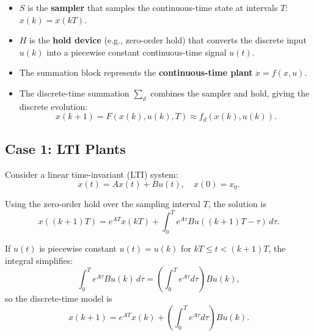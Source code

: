 \begin{center}
\end{center}

\begin{itemize}
    \item \(S\) is the \textbf{sampler} that samples the continuous-time state at intervals \(T\): \(x(k)=x(kT)\).  
    \item \(H\) is the \textbf{hold device} (e.g., zero-order hold) that converts the discrete input \(u(k)\) into a piecewise constant continuous-time signal \(u(t)\).  
    \item The summation block represents the \textbf{continuous-time plant} \(\dot{x}=f(x,u)\).  
    \item The discrete-time summation \(\sum_d\) combines the sampler and hold, giving the discrete evolution:
    \begin{equation}
    x(k+1) = F(x(k), u(k), T) \approx f_d(x(k),u(k)).
    \end{equation}
\end{itemize}

\subsection{Case 1: LTI Plants}

Consider a linear time-invariant (LTI) system:
\begin{equation}
\dot{x}(t) = A x(t) + B u(t), \quad x(0) = x_0.
\end{equation}

Using the zero-order hold over the sampling interval \(T\), the solution is
\begin{equation}
x((k+1)T) = e^{A T} x(kT) + \int_{0}^{T} e^{A\tau} B u((k+1)T - \tau) \, d\tau.
\end{equation}

If \(u(t)\) is piecewise constant \(u(t) = u(k)\) for \(kT \le t < (k+1)T\), the integral simplifies:
\begin{equation}
\int_0^T e^{A \tau} B u(k) \, d\tau = \left(\int_0^T e^{A \tau} d\tau \right) B u(k),
\end{equation}
so the discrete-time model is
\begin{equation}
\boxed{x(k+1) = e^{A T} x(k) + \left( \int_0^T e^{A \tau} d\tau \right) B u(k)}.
\end{equation}

